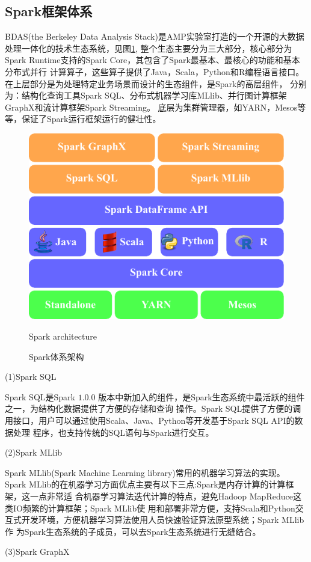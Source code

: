 \subsection{Spark框架体系}
BDAS(the Berkeley Data Analysis Stack)是AMP实验室打造的一个开源的大数据处理一体化的技术生态系统，见图\ref{fig:sparkarchitecture},
整个生态主要分为三大部分，核心部分为Spark Runtime支持的Spark Core，其包含了Spark最基本、最核心的功能和基本分布式并行
计算算子，这些算子提供了Java，Scala，Python和R编程语言接口。在上层部分是为处理特定业务场景而设计的生态组件，是Spark的高层组件，
分别为：结构化查询工具Spark SQL、分布式机器学习库MLlib、并行图计算框架GraphX和流计算框架Spark Streaming。
底层为集群管理器，如YARN，Mesos等等，保证了Spark运行框架运行的健壮性。
\begin{figure}
\centering
\includegraphics[width=0.6 \linewidth]{figures/spark.pdf} \\
\caption{Spark体系架构}{Spark architecture}
\label{fig:sparkarchitecture}
\end{figure}

(1)Spark SQL

Spark SQL是Spark $1.0.0$ 版本中新加入的组件，是Spark生态系统中最活跃的组件之一，为结构化数据提供了方便的存储和查询
操作\cite{Guller2015Spark}。Spark SQL提供了方便的调用接口，用户可以通过使用Scala、Java、Python等开发基于Spark SQL API的数据处理
程序，也支持传统的SQL语句与Spark进行交互。

(2)Spark MLlib

Spark MLlib(Spark Machine Learning library)常用的机器学习算法的实现\cite{MllibMLlib}。
Spark MLlib的在机器学习方面优点主要有以下三点:Spark是内存计算的计算框架，这一点非常适
合机器学习算法迭代计算的特点，避免Hadoop MapReduce这类IO频繁的计算框架；Spark MLlib使
用和部署非常方便，支持Scala和Python交互式开发环境，方便机器学习算法使用人员快速验证算法原型系统；Spark MLlib作
为Spark生态系统的子成员，可以去Spark生态系统进行无缝结合。

(3)Spark GraphX

